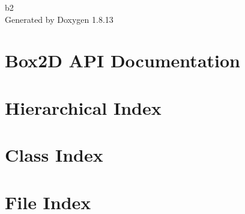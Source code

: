 \documentclass[twoside]{book}
\newcommand{\+}{\discretionary{\mbox{\scriptsize$\hookleftarrow$}}{}{}}
\newcommand{\clearemptydoublepage}{%
  \newpage{\pagestyle{empty}\cleardoublepage}%
}
\begin{document}
\hypersetup{pageanchor=false,
             bookmarksnumbered=true,
             pdfencoding=unicode
            }
\begin{titlepage}
\vspace*{7cm}
\begin{center}%
{\Large b2 }\\
\vspace*{1cm}
{\large Generated by Doxygen 1.8.13}\\
\end{center}
\end{titlepage}
\clearemptydoublepage
{}
\tableofcontents
\clearemptydoublepage
{}
\hypersetup{pageanchor=true}

\chapter{Box2D A\+PI Documentation}
\label{index}\hypertarget{index}{}
\chapter{Hierarchical Index}

\chapter{Class Index}

\chapter{File Index}

\end{document}
